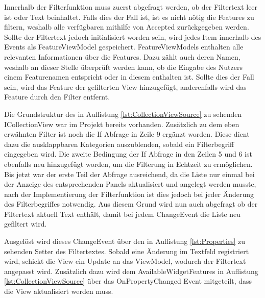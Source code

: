 \newpage


Innerhalb der Filterfunktion muss zuerst abgefragt werden, ob der Filtertext leer ist oder Text beinhaltet.
Falls dies der Fall ist, ist es nicht nötig die Features zu filtern, weshalb alle verfügbaren mithilfe von Accepted zurückgegeben werden.
Sollte der Filtertext jedoch initialisiert worden sein, wird jedes Item innerhalb des Events als FeatureViewModel gespeichert.
FeatureViewModels enthalten alle relevanten Informationen über die Features.
Dazu zählt auch deren Namen, weshalb an dieser Stelle überprüft werden kann, ob die Eingabe des Nutzers einem Featurenamen entspricht oder in diesem enthalten ist.
Sollte dies der Fall sein, wird das Feature der gefilterten View hinzugefügt, anderenfalls wird das Feature durch den Filter entfernt.



Die Grundstruktur des in Auflistung \ref{lst:CollectionViewSource} zu sehenden ICollectionView war im Projekt bereits vorhanden. 
Zusätzlich zu dem eben erwähnten Filter ist noch die If Abfrage in Zeile 9 ergänzt worden.
Diese dient dazu die ausklappbaren Kategorien auszublenden, sobald ein Filterbegriff eingegeben wird.
Die zweite Bedingung der If Abfrage in den Zeilen 5 und 6 ist ebenfalls neu hinzugefügt worden, um die Filterung in Echtzeit zu ermöglichen.
Bis jetzt war der erste Teil der Abfrage ausreichend, da die Liste nur einmal bei der Anzeige des entsprechenden Panels aktualisiert und angelegt werden musste, nach der Implementierung der Filterfunktion ist dies jedoch bei jeder Änderung des Filterbegriffes notwendig.
Aus diesem Grund wird nun auch abgefragt ob der Filtertext aktuell Text enthält, damit bei jedem ChangeEvent die Liste neu gefiltert wird.

Ausgelöst wird dieses ChangeEvent über den in Auflistung \ref{lst:Properties} zu sehenden Setter des Filtertextes.
Sobald eine Änderung im Textfeld registriert wird, schickt die View ein Update an das ViewModel, wodurch der Filtertext angepasst wird.
Zusätzlich dazu wird dem AvailableWidgetFeatures in Auflistung \ref{lst:CollectionViewSource} über das OnPropertyChanged Event mitgeteilt, dass die View aktualisiert werden muss.




